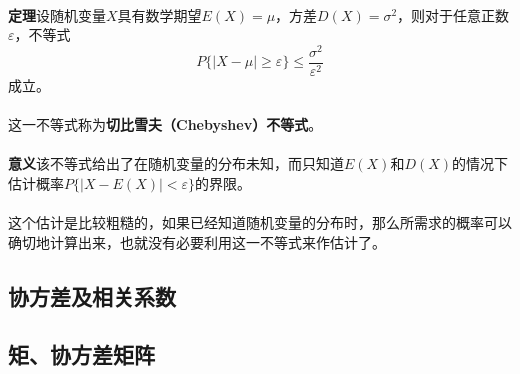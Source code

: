 \paragraph{}
\textbf{定理\;}设随机变量$X$具有数学期望$E(X)=\mu$，方差$D(X)=\sigma^2$，则对于任意正数$\varepsilon$，不等式
\begin{equation}
  P\{|X-\mu| \geq \varepsilon \} \leq \frac{\sigma^2}{\varepsilon^2}
\end{equation}
成立。

\paragraph{}
这一不等式称为\textbf{切比雪夫（Chebyshev）不等式}。

\paragraph{}
\textbf{意义\;}该不等式给出了在随机变量的分布未知，而只知道$E(X)$和$D(X)$的情况下估计概率$P\{|X-E(X)|<\varepsilon\}$的界限。
\paragraph{}
这个估计是比较粗糙的，如果已经知道随机变量的分布时，那么所需求的概率可以确切地计算出来，也就没有必要利用这一不等式来作估计了。

\subsection{协方差及相关系数}
\paragraph{}

\subsection{矩、协方差矩阵}
\paragraph{}
